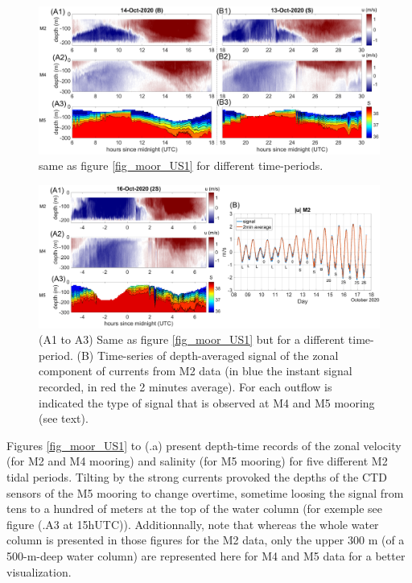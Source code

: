 \begin{figure}[!h]
 \includegraphics[width=\textwidth]{./GBR3D/US_moorings2.png}
 \caption [Time-series of mooring data from M2, M4 and M5]{same as figure \ref{fig_moor_US1} for different time-periods.}
 \label{fig_moor_US2}
\end{figure}

\begin{figure}[!h]
 \includegraphics[width=\textwidth]{./GBR3D/US_moorings3.png}
 \caption [(A)Time-series of mooring data from M2, M4 and M5. (B) Depth-averaged signal of the zonal component of currents at M2 with type of signal observed at M4 and M5 after each outflow.]{(A1 to A3) Same as figure \ref{fig_moor_US1} but for a different time-period. (B) Time-series of depth-averaged signal of the zonal component of currents from M2 data (in blue the instant signal recorded, in red the 2 minutes average). For each outflow is indicated the type of signal that is observed at M4 and M5 mooring (see text).}
 \label{fig_moor_US3}
\end{figure}

Figures \ref{fig_moor_US1} to (.a) present depth-time records of the zonal velocity (for M2 and M4 mooring) and salinity (for M5 mooring) for five different M2 tidal periods. Tilting by the strong currents provoked the depths of the CTD sensors of the M5 mooring to change overtime, sometime loosing the signal from tens to a hundred of meters at the top of the water column (for exemple see figure (.A3 at 15hUTC)). Additionnally, note that whereas the whole water column is presented in those figures for the M2 data, only the upper 300 m (of a 500-m-deep water column) are represented here for M4 and M5 data for a better visualization.

